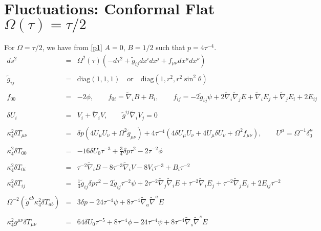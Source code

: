 \documentclass[10pt,letterpaper]{article}
\numberwithin{equation}{section}
\begin{document}
\section{Fluctuations: Conformal Flat $\Omega(\tau)=\tau/2$}
For $\Omega = \tau/2$, we have from \eqref{p1} $A=0$, $B=1/2$ such that $p = 4\tau^{-4}$.
\begin{eqnarray}
ds^2 &=& \Omega^2(\tau)(-d\tau^2 + \tilde g_{ij} dx^i dx^j + f_{\mu\nu} dx^\mu dx^\nu)
\\ \nonumber\\
\tilde g_{ij} &=& \text{diag}(1,1,1)\quad\text{or}\quad \text{diag}(1,r^2,r^2\sin^2\theta)
\\ \nonumber\\
f_{00} &=& -2\phi,\qquad f_{0i}= \tilde \nabla_i B + B_i,\qquad 
f_{ij} = -2 \tilde g_{ij}\psi + 2\tilde\nabla_i\tilde \nabla_j E + \tilde \nabla_i E_j + \tilde \nabla_j E_i + 2E_{ij}
\\ \nonumber\\
\delta U_i &=& V_i + \tilde\nabla_i V,\qquad \tilde g^{ij}\tilde\nabla_i V_j = 0
\\ \nonumber\\
\kappa^2_4 \delta T_{\mu\nu} &=& \delta p(4 U_\mu U_\nu + \Omega^2\tilde g_{\mu\nu})+ 4\tau^{-4}\left(
4 \delta U_\mu U_\nu + 4U_\mu \delta U_\nu + \Omega^2 f_{\mu\nu}\right),\qquad U^\mu= \Omega^{-1}\delta^\mu_0
\\ \nonumber\\
\kappa^2_4 \delta T_{00} &=& -16 \delta U_{0}{} \tau^{-3} + \tfrac{3}{4} \delta p \tau^2 - 2 \tau^{-2} \phi 
\\ \nonumber\\
\kappa^2_4 \delta T_{0i} &=&\tau^{-2} \tilde{\nabla}_{i}B - 8 \tau^{-3} \tilde{\nabla}_{i}V
-8 V_{i} \tau^{-3} + B_{i} \tau^{-2}
\\ \nonumber\\
\kappa^2_4 \delta T_{ij} &=& \tfrac{1}{4} \tilde{g}_{ij} \delta p \tau^2 - 2 \tilde{g}_{ij} \tau^{-2} \psi + 2 \tau^{-2} \tilde{\nabla}_{j}\tilde{\nabla}_{i}E
+\tau^{-2} \tilde{\nabla}_{i}E_{j} + \tau^{-2} \tilde{\nabla}_{j}E_{i}+2 E_{ij} \tau^{-2}
\\ \nonumber\\
\Omega^{-2} (\tilde g^{ab} \kappa^2_4 \delta T_{ab}) &=& 3\delta p -24\tau^{-4}\psi + 8\tau^{-4}\tilde\nabla_a\tilde\nabla^a E
\\ \nonumber\\
\kappa^2_4g^{\mu\nu}\delta T_{\mu\nu} &=& 64 \delta U_{0}{} \tau^{-5} + 8 \tau^{-4} \phi - 24 \tau^{-4} \psi + 8 \tau^{-4} \tilde{\nabla}_{s}\tilde{\nabla}^{s}E

\end{eqnarray}
\end{document}
